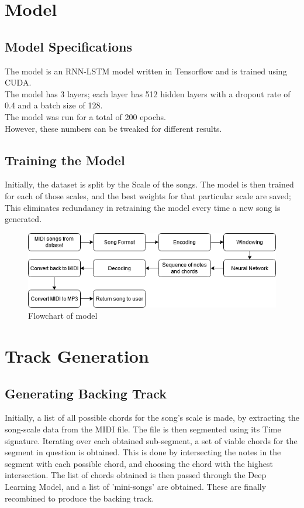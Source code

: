 \documentclass[12pt]{report}
\begin{document}
\section{Model}
\subsection{Model Specifications}
The model is an RNN-LSTM model written in Tensorflow and is trained using CUDA.\\
The model has 3 layers; each layer has 512 hidden layers with a dropout rate of 0.4 and a batch size of 128.\\
The model was run for a total of 200 epochs.
\\However, these numbers can be tweaked for different results.
\subsection{Training the Model}
Initially, the dataset is split by the Scale of the songs. The model is then trained for each of those scales, and the best weights for that particular scale are saved; This eliminates redundancy in retraining the model every time a new song is generated.
\begin{figure}[ht]
  \includegraphics[width =\columnwidth]{Flowchart_model.png}
  \caption{Flowchart of model}
  \label{flowchart_model}
\end{figure}

\section{Track Generation}
\subsection{Generating Backing Track}
Initially, a list of all possible chords for the song's scale is made, by extracting the song-scale data from the MIDI file. The file is then segmented using its Time signature.
Iterating over each obtained sub-segment, a set of viable chords for the segment in question is obtained. This is done by intersecting the notes in the segment with each possible chord, and choosing the chord with the highest intersection. The list of chords obtained is then passed through the Deep Learning Model, and a list of 'mini-songs' are obtained. These are finally recombined to produce the backing track.
\end{document}
